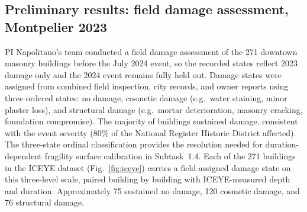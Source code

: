 \documentclass[11pt]{article}
\begin{document}
%

\subsection{Preliminary results: field damage assessment, Montpelier 2023}
PI Napolitano's team conducted a field damage assessment of the 271 downtown
masonry buildings before the July 2024 event, so the recorded states reflect
2023 damage only and the 2024 event remains fully held out. Damage states were
assigned from combined field inspection, city records, and owner reports using
three ordered states: no damage, cosmetic damage (e.g.\ water staining, minor
plaster loss), and structural damage (e.g.\ mortar deterioration, masonry
cracking, foundation compromise). The majority of buildings sustained damage,
consistent with the event severity (80\% of the National Register Historic District
affected). The three-state ordinal classification provides the resolution needed
for duration-dependent fragility surface calibration in Subtask~1.4.
Each of the 271 buildings in the ICEYE dataset (Fig.~\ref{fig:iceye}) carries
a field-assigned damage state on this three-level scale, paired building by
building with ICEYE-measured depth and duration. Approximately 75 sustained no
damage, 120 cosmetic damage, and 76 structural damage.
\end{document}
